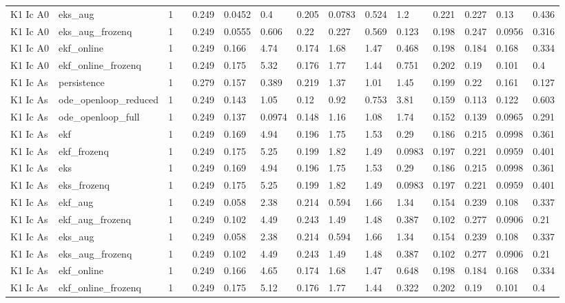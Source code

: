\begin{table}[t]
\begin{tabular}{lllllllllllllll}
K1 Ic A0 & eks\_aug & 1 &  & 0.249 & 0.0452 & 0.4 & 0.205 & 0.0783 & 0.524 & 1.2 & 0.221 & 0.227 & 0.13 & 0.436 \\
K1 Ic A0 & eks\_aug\_frozenq & 1 &  & 0.249 & 0.0555 & 0.606 & 0.22 & 0.227 & 0.569 & 0.123 & 0.198 & 0.247 & 0.0956 & 0.316 \\
K1 Ic A0 & ekf\_online & 1 &  & 0.249 & 0.166 & 4.74 & 0.174 & 1.68 & 1.47 & 0.468 & 0.198 & 0.184 & 0.168 & 0.334 \\
K1 Ic A0 & ekf\_online\_frozenq & 1 &  & 0.249 & 0.175 & 5.32 & 0.176 & 1.77 & 1.44 & 0.751 & 0.202 & 0.19 & 0.101 & 0.4 \\
K1 Ic As & persistence & 1 &  & 0.279 & 0.157 & 0.389 & 0.219 & 1.37 & 1.01 & 1.45 & 0.199 & 0.22 & 0.161 & 0.127 \\
K1 Ic As & ode\_openloop\_reduced & 1 &  & 0.249 & 0.143 & 1.05 & 0.12 & 0.92 & 0.753 & 3.81 & 0.159 & 0.113 & 0.122 & 0.603 \\
K1 Ic As & ode\_openloop\_full & 1 &  & 0.249 & 0.137 & 0.0974 & 0.148 & 1.16 & 1.08 & 1.74 & 0.152 & 0.139 & 0.0965 & 0.291 \\
K1 Ic As & ekf & 1 &  & 0.249 & 0.169 & 4.94 & 0.196 & 1.75 & 1.53 & 0.29 & 0.186 & 0.215 & 0.0998 & 0.361 \\
K1 Ic As & ekf\_frozenq & 1 &  & 0.249 & 0.175 & 5.25 & 0.199 & 1.82 & 1.49 & 0.0983 & 0.197 & 0.221 & 0.0959 & 0.401 \\
K1 Ic As & eks & 1 &  & 0.249 & 0.169 & 4.94 & 0.196 & 1.75 & 1.53 & 0.29 & 0.186 & 0.215 & 0.0998 & 0.361 \\
K1 Ic As & eks\_frozenq & 1 &  & 0.249 & 0.175 & 5.25 & 0.199 & 1.82 & 1.49 & 0.0983 & 0.197 & 0.221 & 0.0959 & 0.401 \\
K1 Ic As & ekf\_aug & 1 &  & 0.249 & 0.058 & 2.38 & 0.214 & 0.594 & 1.66 & 1.34 & 0.154 & 0.239 & 0.108 & 0.337 \\
K1 Ic As & ekf\_aug\_frozenq & 1 &  & 0.249 & 0.102 & 4.49 & 0.243 & 1.49 & 1.48 & 0.387 & 0.102 & 0.277 & 0.0906 & 0.21 \\
K1 Ic As & eks\_aug & 1 &  & 0.249 & 0.058 & 2.38 & 0.214 & 0.594 & 1.66 & 1.34 & 0.154 & 0.239 & 0.108 & 0.337 \\
K1 Ic As & eks\_aug\_frozenq & 1 &  & 0.249 & 0.102 & 4.49 & 0.243 & 1.49 & 1.48 & 0.387 & 0.102 & 0.277 & 0.0906 & 0.21 \\
K1 Ic As & ekf\_online & 1 &  & 0.249 & 0.166 & 4.65 & 0.174 & 1.68 & 1.47 & 0.648 & 0.198 & 0.184 & 0.168 & 0.334 \\
K1 Ic As & ekf\_online\_frozenq & 1 &  & 0.249 & 0.175 & 5.12 & 0.176 & 1.77 & 1.44 & 0.322 & 0.202 & 0.19 & 0.101 & 0.4 \\

\end{tabular}
\end{table}
